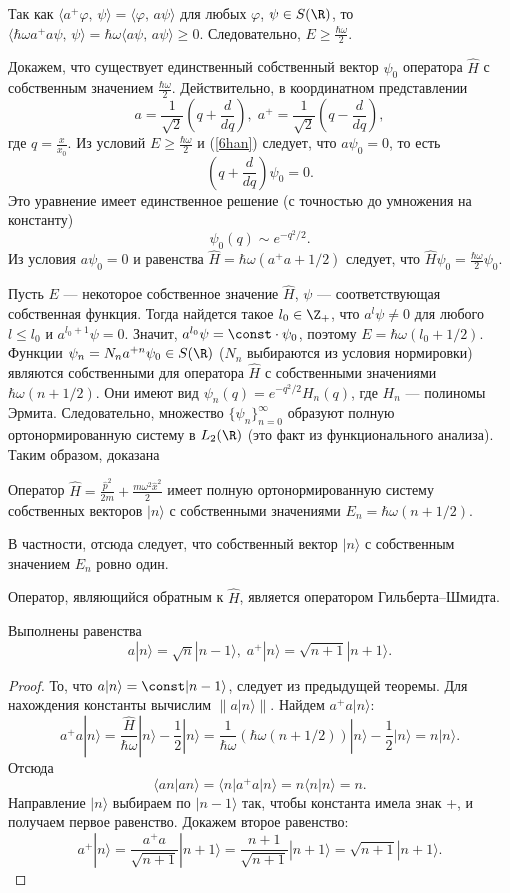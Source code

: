 \documentclass[a4paper
]{article}
\begin{document}
Так как $\langle a^+\varphi , \, \psi\rangle =\langle \varphi , \, a\psi\rangle$
для любых $\varphi$, $\psi\in S(\R)$, то $\langle \hbar\omega a^+a\psi , \,
\psi\rangle =\hbar\omega\langle a\psi, \, a\psi\rangle\ge 0$. Следовательно,
$E\ge \frac{\hbar\omega}{2}$. \par
Докажем, что существует единственный собственный вектор $\psi_0$ оператора
$\hat{H}$ с собственным значением $\frac{\hbar\omega}{2}$. Действительно,
в координатном представлении
$$a=\frac{1}{\sqrt{2}}\left(q+\frac{d}{dq}\right), \; a^+=\frac{1}{\sqrt{2}}
\left(q-\frac{d}{dq}\right),$$
где $q=\frac{x}{x_0}$. Из условий $E\ge \frac{\hbar\omega}{2}$ и (\ref{6han})
следует, что $a\psi_0=0$, то есть
$$\left(q+\frac{d}{dq}\right)\psi_0=0.$$
Это уравнение имеет единственное решение (с точностью до умножения
на константу) $$\psi_0(q)\sim e^{-q^2/2}.$$ Из условия $a\psi_0=0$ и
равенства $\hat{H}=\hbar\omega(a^+a+1/2)$ следует, что $\hat{H}\psi_0
=\frac{\hbar\omega}{2}\psi_0$. \par
Пусть $E$ --- некоторое собственное значение $\hat{H}$, $\psi$ ---
соответствующая собственная функция. Тогда найдется
такое $l_0\in \Z_+$, что $a^l\psi\ne 0$ для любого $l\le l_0$ и $a^{l_0+1}
\psi=0$. Значит, $a^{l_0}\psi=\const\cdot\psi_0$, поэтому $E=\hbar\omega(l_0+
1/2)$. Функции $\psi_n=N_na^{+n}\psi_0\in S(\R)$ ($N_n$ выбираются из
условия нормировки) являются собственными
для оператора $\hat{H}$ с собственными значениями $\hbar\omega(n+1/2)$.
Они имеют вид $\psi_n(q)=e^{-q^2/2}H_n(q)$, где $H_n$ --- полиномы
Эрмита. Следовательно, множество $\{\psi_n\}_{n=0}^\infty$ образуют
полную ортонормированную систему в $L_2(\R)$ (это факт из функционального
анализа). Таким образом, доказана
\begin{Trm}
Оператор $\hat{H}=\frac{\hat{p}^2}{2m}+\frac{m\omega^2 \hat{x}^2}{2}$
имеет полную ортонормированную систему собственных векторов $|n\rangle$
с собственными значениями $E_n=\hbar\omega(n+1/2)$.
\end{Trm}
В частности, отсюда следует, что собственный вектор $|n\rangle$ с собственным
значением $E_n$ ровно один.
\begin{Cor}
Оператор, являющийся обратным к $\hat H$, является оператором
Гильберта--Шмидта.
\end{Cor}
\begin{Sta}
Выполнены равенства $$a|n\rangle=\sqrt{n}|n-1\rangle, \; a^+|n\rangle =
\sqrt{n+1}|n+1\rangle .$$
\end{Sta}
\begin{proof}
То, что $a|n\rangle=\const|n-1\rangle$, следует из предыдущей теоремы.
Для нахождения константы вычислим $\|a|n\rangle\|$.
Найдем $a^+a|n\rangle$: $$a^+a|n\rangle =\frac{\hat H}{\hbar\omega}|n\rangle
-\frac12|n\rangle =\frac{1}{\hbar\omega}(\hbar\omega(n+1/2))|n\rangle
-\frac12|n\rangle =n|n\rangle .$$ Отсюда $$\langle an|an\rangle =\langle n|a^+a|n\rangle
=n\langle n|n\rangle =n.$$ Направление $|n\rangle$
выбираем по $|n-1\rangle$ так, чтобы константа имела знак +, и получаем первое равенство.
Докажем второе равенство:
$$a^+|n\rangle=\frac{a^+a}{\sqrt{n+1}}|n+1\rangle=\frac{n+1}{\sqrt{n+1}}
|n+1\rangle=\sqrt{n+1}|n+1\rangle.$$
\end{proof}
\end{document}
